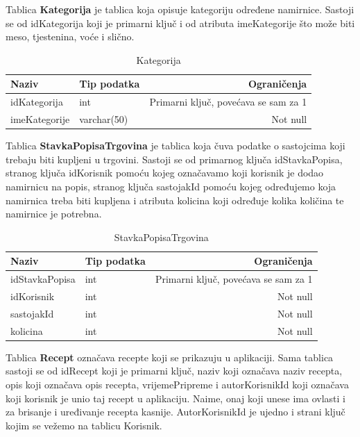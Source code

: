 \documentclass[diplomskirad]{fer}
\begin{document}
Tablica \textbf{Kategorija} je tablica koja opisuje kategoriju određene namirnice. Sastoji se od idKategorija koji je primarni ključ i od atributa imeKategorije što može biti meso, tjestenina, voće i slično.

\begin{table}[htb]
\label{tbl:Kategorija}
\centering
\renewcommand{\arraystretch}{1.3}
\begin{tabular}{llr} \hline
Naziv & Tip podatka & Ograničenja\\ \hline
idKategorija & int & Primarni ključ, povećava se sam za 1 \\
imeKategorije & varchar(50) & Not null\\
\end{tabular}
\caption{Kategorija}
\end{table}

Tablica \textbf{StavkaPopisaTrgovina} je tablica koja čuva podatke o sastojcima koji trebaju biti kupljeni u trgovini. Sastoji se od primarnog ključa idStavkaPopisa, stranog ključa idKorisnik pomoću kojeg označavamo koji korisnik je dodao namirnicu na popis, stranog ključa sastojakId pomoću kojeg određujemo koja namirnica treba biti kupljena i atributa kolicina koji određuje kolika količina te namirnice je potrebna.


\begin{table}[htb]
\label{tbl:PopisTrgovina}
\centering
\renewcommand{\arraystretch}{1.3}
\begin{tabular}{llr} \hline
Naziv & Tip podatka & Ograničenja\\ \hline
idStavkaPopisa & int & Primarni ključ, povećava se sam za 1 \\
idKorisnik & int & Not null\\
sastojakId & int & Not null\\
kolicina & int & Not null\\
\end{tabular}
\caption{StavkaPopisaTrgovina}
\end{table}

Tablica \textbf{Recept} označava recepte koji se prikazuju u aplikaciji. Sama tablica sastoji se od idRecept koji je primarni ključ, naziv koji označava naziv recepta, opis koji označava opis recepta, vrijemePripreme i autorKorisnikId koji označava koji korisnik je unio taj recept u aplikaciju. Naime, onaj koji unese ima ovlasti i za brisanje i uređivanje recepta kasnije. AutorKorisnikId je ujedno i strani ključ kojim se vežemo na tablicu Korisnik.
\end{document}
